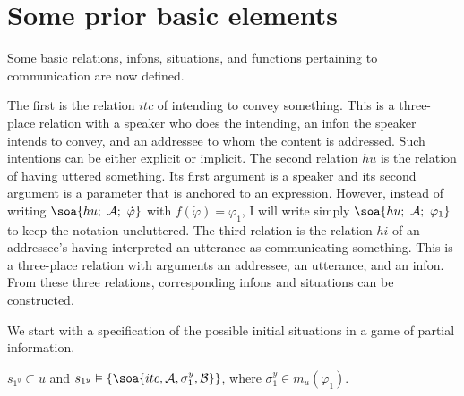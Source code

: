 \section{Some prior basic elements}\label{sec:A.2}

Some basic relations, infons, situations, and functions pertaining to communication are now defined.

The first is the relation $itc$ of intending to convey something. This is a three-place relation with a speaker who does the intending, an infon the speaker intends to convey, and an addressee to whom the content is addressed. Such intentions can be either explicit or implicit. The second relation $hu$ is the relation of having uttered something. Its first argument is a speaker and its second argument is a parameter that is anchored to an expression. However, instead of writing $\soa{hu;\ {\cal A};\ \dot{\varphi}}$ with $f(\dot{\varphi}) = \varphi_1$, I will write simply $\soa{hu;\ {\cal A};\ \varphi_1}$ to keep the notation uncluttered.  The third relation is the relation $hi$ of an addressee's having interpreted an utterance as communicating something. This is a three-place relation with arguments an  addressee, an utterance, and an infon. From these three relations, corresponding infons and situations can be constructed.




We start with a specification of the possible initial situations in a game of partial information.

\begin{definition}  $s_{1^y} \subset u$ and $s_{1^y} \vDash \{ \soa{itc, {\cal A}, \sigma_{1}^{y}, {\cal B}} \}$, where $\sigma_1^{y} \in m_u(\varphi_1)$.\label{def:A.1}\end{definition}



